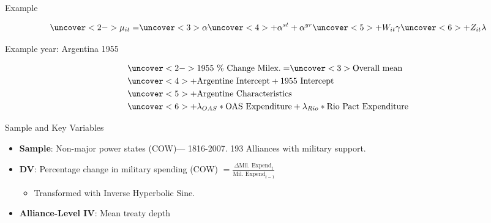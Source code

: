 \documentclass[12pt]{beamer}
\begin{document}
\begin{frame}{Example}


\begin{equation*}
\uncover<2->{\mu_{it} =} \uncover<3>{\alpha} \uncover<4>{+ \alpha^{st} + \alpha^{yr}} \uncover<5>{+ W_{it} \gamma} \uncover<6>{+ Z_{it} \lambda}
\end{equation*}

Example year: Argentina 1955

\begin{equation*}
\begin{split}
& \uncover<2->{\mbox{1955 \% Change Milex.} = } \uncover<3>{\mbox{Overall mean}} \\
& \uncover<4>{+ \mbox{Argentine Intercept} + \mbox{1955 Intercept}} \\
& \uncover<5>{+ \mbox{Argentine Characteristics}} \\
& \uncover<6>{+ \lambda_{OAS} * \mbox{OAS Expenditure} + \lambda_{Rio} * \mbox{Rio Pact Expenditure}}
\end{split}
\end{equation*}



\end{frame}




\begin{frame}{Sample and Key Variables}

\begin{itemize}
\item \textbf{Sample}: Non-major power states (COW)--- 1816-2007. 193 Alliances with military support. 
\pause
\item \textbf{DV}: Percentage change in military spending (COW) $ = \frac{ \Delta \mbox{Mil. Expend}_t }{ \mbox{Mil. Expend}_{t-1} }$ 
\pause
\begin{itemize} 
\item Transformed with Inverse Hyperbolic Sine. 
\end{itemize} 
\pause
\item \textbf{Alliance-Level IV}: Mean treaty depth
\end{itemize} 

\end{frame}
\end{document}
